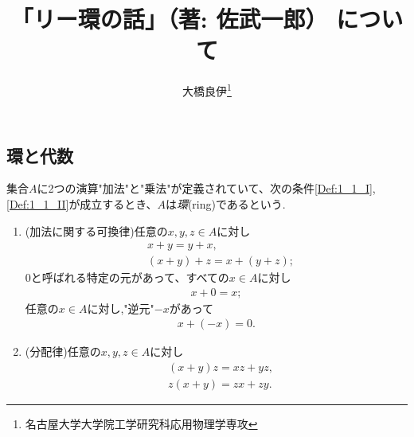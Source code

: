 \documentclass[fleqn,twocolumn,titlepage,dvipdfmx]{jsarticle}
\title{「リー環の話」（著: 佐武一郎） について}
\author{大橋良伊\thanks{名古屋大学大学院工学研究科応用物理学専攻}}
\date{}
\begin{document}
\maketitle
\tableofcontents


\clearpage
{}

\subsection{環と代数}

\begin{definition}[環]\label{Def:1_1}
  集合$A$に2つの演算"加法"と"乗法"が定義されていて、次の条件\ref{Def:1_1_I},\ref{Def:1_1_II}が成立するとき、$A$は\emph{環}(ring)であるという.
  \begin{enumerate}[label=(\Roman*)]
    \item \label{Def:1_1_I}
      (加法に関する可換律)任意の$x,y,z\in A$に対し
      \begin{align}
        & x+y = y+x,\\
        & (x+y)+z = x+(y+z);
      \end{align}
      $0$と呼ばれる特定の元があって、すべての$x\in A$に対し
      \begin{align}
        x+0=x;
      \end{align}
      任意の$x\in A$に対し,"逆元"$-x$があって
      \begin{align}
        x+(-x)=0.
      \end{align}
    \item \label{Def:1_1_II}
      (分配律)任意の$x,y,z\in A$に対し
      \begin{align}
        & (x+y)z = xz+yz,\\
        & z(x+y) = zx+zy.
      \end{align}
  \end{enumerate}
\end{definition}
\end{document}
